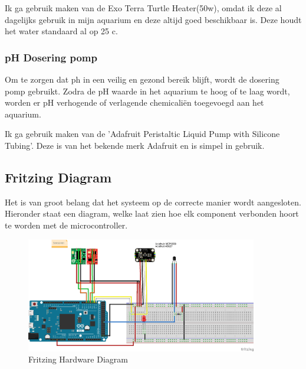 \documentclass[a4paper]{report}
\begin{document}
Ik ga gebruik maken van de Exo Terra Turtle Heater(50w), omdat ik deze al dagelijks gebruik in mijn aquarium en deze altijd goed beschikbaar is.
Deze houdt het water standaard al op 25 \textdegree c. 

\subsubsection{pH Dosering pomp}
Om te zorgen dat ph in een veilig en gezond bereik blijft, wordt de dosering pomp gebruikt. 
Zodra de pH waarde in het aquarium te hoog of te laag wordt, worden er pH verhogende of verlagende chemicaliën toegevoegd aan het aquarium.

Ik ga gebruik maken van de 'Adafruit Peristaltic Liquid Pump with Silicone Tubing'. Deze is van het bekende merk Adafruit en is simpel in gebruik.


\subsection{Fritzing Diagram}
Het is van groot belang dat het systeem op de correcte manier wordt aangesloten. Hieronder staat een diagram, welke laat zien hoe elk component verbonden hoort te worden met de microcontroller.
\begin{figure}[h]
  \centering
  \includegraphics[width=0.9\textwidth]{Images/hardware_sketch_fritzing.png}
  \caption{Fritzing Hardware Diagram}
  \label{fig:hardware_sketch_fritzing}
\end{figure}
\end{document}
